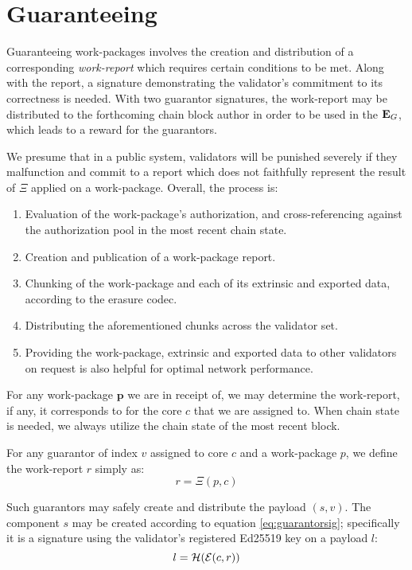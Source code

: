 \section{Guaranteeing}\label{sec:guaranteeing}

Guaranteeing work-packages involves the creation and distribution of a corresponding \emph{work-report} which requires certain conditions to be met. Along with the report, a signature demonstrating the validator's commitment to its correctness is needed. With two guarantor signatures, the work-report may be distributed to the forthcoming \Jam chain block author in order to be used in the $\mathbf{E}_G$, which leads to a reward for the guarantors.

We presume that in a public system, validators will be punished severely if they malfunction and commit to a report which does not faithfully represent the result of $\Xi$ applied on a work-package. Overall, the process is:

\begin{enumerate}
    \item Evaluation of the work-package's authorization, and cross-referencing against the authorization pool in the most recent \Jam chain state.
    \item Creation and publication of a work-package report.
    \item Chunking of the work-package and each of its extrinsic and exported data, according to the erasure codec.
    \item Distributing the aforementioned chunks across the validator set.
    \item Providing the work-package, extrinsic and exported data to other validators on request is also helpful for optimal network performance.
\end{enumerate}

For any work-package $\mathbf{p}$ we are in receipt of, we may determine the work-report, if any, it corresponds to for the core $c$ that we are assigned to. When \Jam chain state is needed, we always utilize the chain state of the most recent block.

For any guarantor of index $v$ assigned to core $c$ and a work-package $p$, we define the work-report $r$ simply as:
\begin{equation}
  r = \Xi(p, c)
\end{equation}

Such guarantors may safely create and distribute the payload $(s, v)$. The component $s$ may be created according to equation \ref{eq:guarantorsig}; specifically it is a signature using the validator's registered Ed25519 key on a payload $l$:
\begin{equation}
  l = \mathcal{H}(\mathcal{E}(c, r))
\end{equation}

